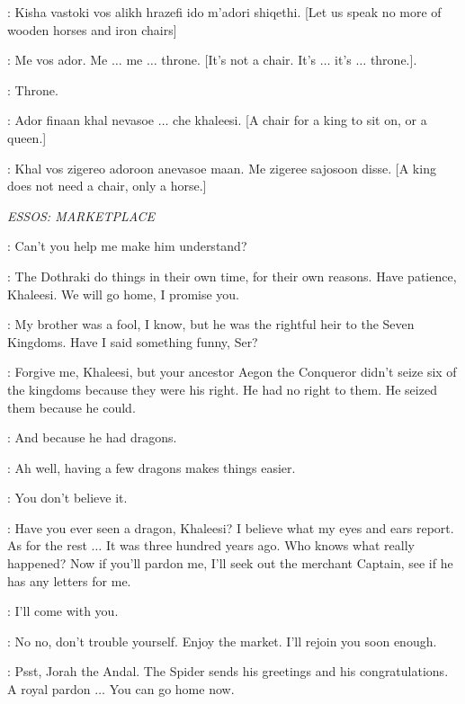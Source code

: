 \DROGO: Kisha vastoki vos alikh hrazefi ido m'adori shiqethi. [Let us speak no more of wooden horses and iron chairs] 

\DAENERYS: Me vos ador. Me $\ldots$ me $\ldots$ throne. [It's not a chair. It's $\ldots$ it's $\ldots$ throne.]. 

\DROGO: Throne. 

\DAENERYS: Ador finaan khal nevasoe $\ldots$ che khaleesi. [A chair for a king to sit on, or a queen.] 

\DROGO: Khal vos zigereo adoroon anevasoe maan. Me zigeree sajosoon disse. [A king does not need a chair, only a horse.] 


\scene

\textit{ESSOS: MARKETPLACE} 


\DAENERYS: Can't you help me make him understand? 

\JORAH: The Dothraki do things in their own time, for their own reasons. Have patience, Khaleesi. We will go home, I promise you. 

\DAENERYS: My brother was a fool, I know, but he was the rightful heir to the Seven Kingdoms. Have I said something funny, Ser? 

\JORAH: Forgive me, Khaleesi, but your ancestor Aegon the Conqueror didn't seize six of the kingdoms because they were his right. He had no right to them. He seized them because he could. 

\DAENERYS: And because he had dragons. 

\JORAH: Ah well, having a few dragons makes things easier. 

\DAENERYS: You don't believe it. 

\JORAH: Have you ever seen a dragon, Khaleesi? I believe what my eyes and ears report. As for the rest $\ldots$ It was three hundred years ago. Who knows what really happened? Now if you'll pardon me, I'll seek out the merchant Captain, see if he has any letters for me. 

\DAENERYS: I'll come with you. 

\JORAH: No no, don't trouble yourself. Enjoy the market. I'll rejoin you soon enough. 


\BOY: Psst, Jorah the Andal. The Spider sends his greetings and his congratulations. A royal pardon $\ldots$ You can go home now. 


